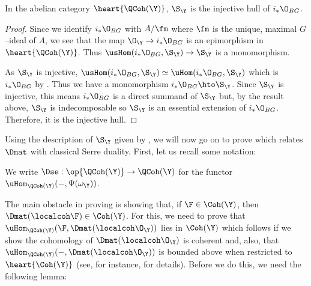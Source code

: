 \documentclass{amsart}
\begin{document}
  \begin{cor}\label{cor:hull}
    In the abelian category \(\heart{\QCoh(\Y)}\), 
    \(\S_\Y\) is the injective hull of \(i_\ast \O_{BG}\).
  \end{cor}
  \begin{proof}
    Since we identify \(i_\ast \O_{BG}\) with \(A/\fm\)
    where \(\fm\) is the unique, maximal \(G\)--ideal
    of \(A\), we see that the map \(\O_\Y \to i_\ast \O_{BG}\)
    is an epimorphism in \(\heart{\QCoh(\Y)}\).
    Thus \(\usHom(i_\ast \O_{BG}, \S_\Y) \to \S_\Y\)
    is a monomorphism.

    As \(\S_\Y\) is injective, \(\usHom(i_\ast \O_{BG}, \S_\Y)
    \simeq \uHom(i_\ast \O_{BG}, \S_\Y)\) which is
    \(i_\ast \O_{BG}\) by .
    Thus we have a monomorphism \(i_\ast \O_{BG} \hto \S_\Y\).
    Since \(\S_\Y\) is injective, this means \(i_\ast \O_{BG}\)
    is a direct summand of \(\S_\Y\) but, by the result above,
    \(\S_\Y\) is indecomposable so \(\S_\Y\) is an essential
    extension of \(i_\ast \O_{BG}\). Therefore, it
    is the injective hull.
  \end{proof}


  Using the description of \(\S_\Y\) given
  by ,
  we will now go on to prove 
  which relates \(\Dmat\) with classical Serre duality.
  First, let us recall some notation:

  \begin{notat}
    We write \(\Dse: \op{\QCoh(\Y)} \to \QCoh(\Y)\) for the functor
    \(\uHom_{\QCoh(\Y)}(-, \Psi(\omega_\Y))\).
  \end{notat}

  The main obstacle in proving  
  is showing that, if \(\F \in \Coh(\Y)\),
  then \(\Dmat(\localcoh \F) \in \Coh(\Y)\).
  For this, we need to prove that \(\uHom_{\QCoh(\Y)}(\F, \Dmat(\localcoh \O_\Y))\)
  lies in \(\Coh(\Y)\) which follows if we show
  the cohomology of \(\Dmat(\localcoh \O_\Y)\) is coherent
  and, also, that \(\uHom_{\QCoh(\Y)}(-, \Dmat(\localcoh \O_\Y))\)
  is bounded above when restricted to \(\heart{\Coh(\Y)}\)
  (see, for instance, \cite[Proposition II.7.20]{hartshorne:1966} for details).
  Before we do this, we need the following lemma:
\end{document}

